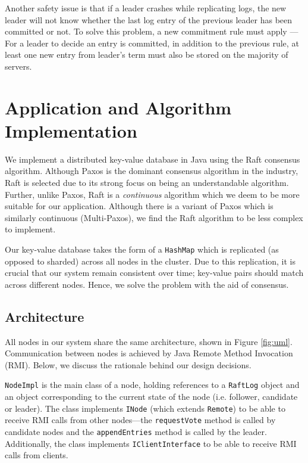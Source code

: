 \documentclass[12pt, a4paper]{article}
\begin{document}
  Another safety issue is that if a leader crashes while replicating logs, the new leader will not know whether the last log entry of the
  previous leader has been committed or not. To solve this problem, a new commitment rule must apply --- For a leader to decide an entry
  is committed, in addition to the previous rule, at least one new entry from leader's term must also be stored on the majority of servers.


\section{Application and Algorithm Implementation} \label{sec:application}
We implement a distributed key-value database in Java using the Raft consensus algorithm. Although Paxos is the dominant consensus algorithm in the industry, Raft is selected due to its strong focus on being an understandable algorithm. Further, unlike Paxos, Raft is a \textit{continuous} algorithm which we deem to be more suitable for our application. Although there is a variant of Paxos which is similarly continuous (Multi-Paxos), we find the Raft algorithm to be less complex to implement.

Our key-value database takes the form of a \texttt{HashMap} which is replicated (as opposed to sharded) across all nodes in the cluster. Due to this replication, it is crucial that our system remain consistent over time; key-value pairs should match across different nodes. Hence, we solve the problem with the aid of consensus.

\subsection{Architecture}
All nodes in our system share the same architecture, shown in Figure \ref{fig:uml}. Communication between nodes is achieved by Java Remote Method Invocation (RMI). Below, we discuss the rationale behind our design decisions.

\texttt{NodeImpl} is the main class of a node, holding references to a \texttt{RaftLog} object and an object corresponding to the current state of the node (i.e. follower, candidate or leader). The class implements \texttt{INode} (which extends \texttt{Remote}) to be able to receive RMI calls from other nodes---the \texttt{requestVote} method is called by candidate nodes and the \texttt{appendEntries} method is called by the leader. Additionally, the class implements \texttt{IClientInterface} to be able to receive RMI calls from clients.
\end{document}
